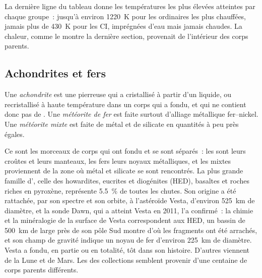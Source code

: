 La dernière ligne du tableau donne les températures les plus élevées atteintes par chaque groupe~: jusqu'à
environ \qty{1220}{K} pour les  ordinaires les plus chauffées, jamais plus de \qty{430}{K} pour les
 CI, imprégnées d'eau mais jamais chaudes. La chaleur, comme le montre la dernière section,
provenait de l'intérieur des corps parents.

\subsection{Achondrites et fers}

\begin{definition}
\label{def:b2:planet-formation-meteorites:classes}
Une \emph{achondrite} est une  pierreuse qui a
cristallisé à partir d'un liquide, ou recristallisé à haute température dans un
corps qui a fondu, et qui ne contient donc pas de . Une \emph{météorite de
fer} est faite surtout d'alliage métallique fer--nickel. Une
\emph{météorite mixte} est faite de métal et de silicate en
quantités à peu près égales.
\end{definition}

Ce sont les morceaux de corps qui ont fondu et se sont séparés~: les  sont
leurs croûtes et leurs manteaux, les fers leurs noyaux métalliques, et les mixtes
proviennent de la zone où métal et silicate se sont rencontrés. La plus grande famille
d', celle des howardites, eucrites et diogénites (HED), basaltes et roches
riches en pyroxène, représente \qty{5.5}{\percent} de toutes les chutes. Son origine a
été rattachée, par son spectre et son orbite, à l'astéroïde Vesta, d'environ
\qty{525}{km} de diamètre, et la sonde Dawn, qui a atteint Vesta en 2011, l'a confirmé~:
la chimie et la minéralogie de la surface de Vesta correspondent aux  HED, un
bassin de \qty{500}{km} de large près de son pôle Sud montre d'où les fragments ont été
arrachés, et son champ de gravité indique un noyau de fer d'environ \qty{225}{km} de
diamètre. Vesta a fondu, en partie ou en totalité, tôt dans son histoire. D'autres
 viennent de la Lune et de Mars. Les  des collections semblent
provenir d'une centaine de corps parents différents.

